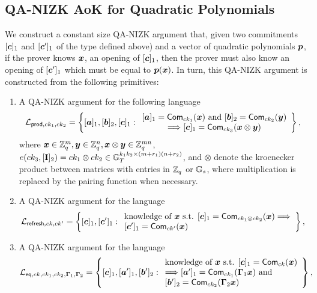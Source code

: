 \subsection{QA-NIZK AoK for Quadratic Polynomials}
We construct a constant size QA-NIZK argument that, given two commitments $[{\boldsymbol{c}}]_1$ and $[{\boldsymbol{c}}']_1$ of the type defined above)  and a vector of quadratic polynomials ${\boldsymbol{p}}$, if the prover knows ${\boldsymbol{x}}$, an opening of $[{\boldsymbol{c}}]_1$, then the prover must also know an opening of $[{\boldsymbol{c}}']_1$ which must be equal to ${\boldsymbol{p}}({\boldsymbol{x}})$.
In turn, this QA-NIZK argument is constructed from the following primitives:
\begin{enumerate}
\item A QA-NIZK argument for the following language
$$
\mathcal{L}_{\mathsf{prod},ck_1,ck_2}=\left\{[{\boldsymbol{a}}]_1,[{\boldsymbol{b}}]_2,[{\boldsymbol{c}}]_1:
	\begin{array}{c}
		[{\boldsymbol{a}}]_1=\mathsf{Com}_{ck_1}({\boldsymbol{x}})\text{ and }
		{[{\boldsymbol{b}}]_2=\mathsf{Com}_{ck_2}({\boldsymbol{y}})}\\
		\Longrightarrow
		[{\boldsymbol{c}}]_1=\mathsf{Com}_{ck_3}({\boldsymbol{x}}\otimes{\boldsymbol{y}})
	\end{array}\right\},
$$
where ${\boldsymbol{x}}\in\mathbb{Z}_q^m,{\boldsymbol{y}}\in\mathbb{Z}_q^n,{\boldsymbol{x}}\otimes{\boldsymbol{y}}\in\mathbb{Z}_q^{mn}$, $e(ck_3,[\mathbf{{I}}]_{2})=ck_1\otimes ck_2\allowbreak\in\mathbb{G}_T^{k_1k_2\times(m+r_1)(n+r_2)}$, and $\otimes$ denote the kroenecker product between matrices with entries in $\mathbb{Z}_q$ or $\mathbb{G}_s$, where multiplication is replaced by the pairing function when necessary.
\item A QA-NIZK argument for the language
$$
\mathcal{L}_{\mathsf{refresh},ck,ck'} = \left\{[{\boldsymbol{c}}]_1,[{\boldsymbol{c}}']_1:
	\begin{array}{l} \text{knowledge of } {\boldsymbol{x}} \text{ s.t. }
		{[{\boldsymbol{c}}]_1=\mathsf{Com}_{ck_1\otimes ck_2}({\boldsymbol{x}})}
		\Longrightarrow\\
		{[{\boldsymbol{c}}']_1=\mathsf{Com}_{ck'}({\boldsymbol{x}})}
	\end{array}\right\},
$$
\item A QA-NIZK argument for the language
$$
\mathcal{L}_{\mathsf{eq},ck,ck_1,ck_2,\mathbf{{\Gamma}}_1,\mathbf{{\Gamma}}_2} = \left\{[{\boldsymbol{c}}]_1,[{\boldsymbol{a}}']_1,[{\boldsymbol{b}}']_2:
	\begin{array}{l}
		\text{knowledge of } {\boldsymbol{x}} \text{ s.t. }[{\boldsymbol{c}}]_1=\mathsf{Com}_{ck}({\boldsymbol{x}})\\
		\Longrightarrow
		[{\boldsymbol{a}}']_1=\mathsf{Com}_{ck_1}(\mathbf{{\Gamma}}_1{\boldsymbol{x}})\text{ and }\\
		{[{\boldsymbol{b}}']_2=\mathsf{Com}_{ck_2}(\mathbf{{\Gamma}}_2{\boldsymbol{x}})}
	\end{array}\right\},
$$
\end{enumerate}

